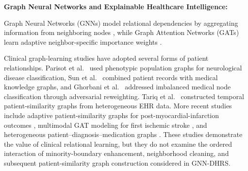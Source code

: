 \documentclass[pdflatex,sn-mathphys-num]{sn-jnl}%
\theoremstyle{thmstyleone}%
\theoremstyle{thmstyletwo}%
\theoremstyle{thmstylethree}%
\begin{document}
\textbf{Graph Neural Networks and Explainable Healthcare Intelligence: }

Graph Neural Networks (GNNs) model relational dependencies by aggregating
information from neighboring nodes \cite{kipf2017semi,wu2021comprehensive},
while Graph Attention Networks (GATs) learn adaptive neighbor-specific
importance weights \cite{velickovic2018graph}.

 {
Clinical graph-learning studies have adopted several forms of patient
relationships. Parisot et al.~\cite{parisot2018disease} used phenotypic
population graphs for neurological disease classification, Sun
et al.~\cite{sun2021disease} combined patient records with medical knowledge
graphs, and Ghorbani et al.~\cite{ghorbani2022ragcn} addressed imbalanced
medical node classification through adversarial reweighting. Tariq
et al.~\cite{tariq2024transfusion} constructed temporal patient-similarity
graphs from heterogeneous EHR data. More recent studies include adaptive
patient-similarity graphs for post-myocardial-infarction outcomes
\cite{guo2026myocardial}, multimodal GAT modeling for first ischemic stroke
\cite{desai2026grasp}, and heterogeneous patient--diagnosis--medication
graphs \cite{cammarasana2026drug}. These studies demonstrate the value of
clinical relational learning, but they do not examine the ordered interaction
of minority-boundary enhancement, neighborhood cleaning, and subsequent
patient-similarity graph construction considered in GNN-DHRS.
}
\end{document}
